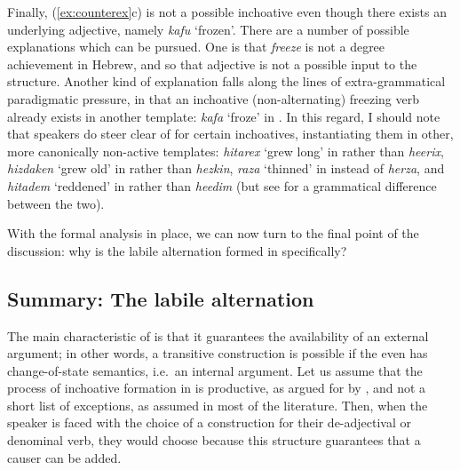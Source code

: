 Finally, (\ref{ex:counterex}c) is not a possible inchoative even though there exists an underlying adjective, namely \emph{kafu} `frozen'. There are a number of possible explanations which can be pursued. One is that \emph{freeze} is not a degree achievement in Hebrew, and so that adjective is not a possible input to the structure. Another kind of explanation falls along the lines of extra-grammatical paradigmatic pressure, in that an inchoative (non-alternating) freezing verb already exists in another template: \emph{kafa} `froze' in {\tkal}. In this regard, I should note that speakers do steer clear of {\thif} for certain inchoatives, instantiating them in other, more canonically non-active templates: \emph{hitarex} `grew long' in {\thit} rather than \emph{heerix}, \emph{hizdaken} `grew old' in {\thit} rather than \emph{hezkin}, \emph{raza} `thinned' in {\tkal} instead of \emph{herza}, and \emph{hitadem} `reddened' in {\thit} rather than \emph{heedim} (but see \citealt[22]{doron03} for a grammatical difference between the two).

With the formal analysis in place, we can now turn to the final point of the discussion: why is the labile alternation formed in {\thif} specifically?


	\subsection{Summary: The labile alternation}
The main characteristic of {\vd} is that it guarantees the availability of an external argument; in other words, a transitive construction is possible if the even has change-of-state semantics, i.e.~an internal argument. Let us assume that the process of inchoative formation in {\thif} is productive, as argued for by \cite{lev16}, and not a short list of exceptions, as assumed in most of the literature. Then, when the speaker is faced with the choice of a construction for their de-adjectival or denominal verb, they would choose {\vd} because this structure guarantees that a causer can be added.

